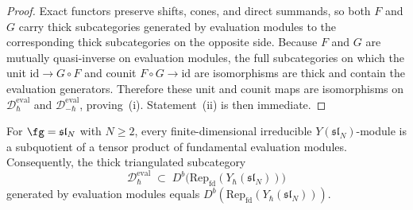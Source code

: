 \begin{proof}
Exact functors preserve shifts, cones, and direct summands, so both
$F$ and $G$ carry thick subcategories generated by evaluation modules
to the corresponding thick subcategories on the opposite side.
Because $F$ and $G$ are mutually quasi-inverse on evaluation modules,
the full subcategories on which the unit
$\mathrm{id}\to G\!\circ F$ and counit $F\!\circ G\to\mathrm{id}$ are
isomorphisms are thick and contain the evaluation generators.
Therefore these unit and counit maps are isomorphisms on
$\mathcal{D}_{\hbar}^{\mathrm{eval}}$ and
$\mathcal{D}_{-\hbar}^{\mathrm{eval}}$, proving~\textup{(i)}.
Statement~\textup{(ii)} is then immediate.
\end{proof}

\begin{proposition}
\label{prop:dk2-thick-generation-typeA}
For $\fg = \mathfrak{sl}_N$ with $N \ge 2$, every finite-dimensional
irreducible $Y(\mathfrak{sl}_N)$-module is a subquotient of a tensor
product of fundamental evaluation modules. Consequently, the
thick triangulated subcategory
\[
\mathcal{D}_{\hbar}^{\mathrm{eval}}
\;\subset\;
D^b\bigl(\mathrm{Rep}_{\mathrm{fd}}(Y_\hbar(\mathfrak{sl}_N))\bigr)
\]
generated by evaluation modules equals
$D^b(\mathrm{Rep}_{\mathrm{fd}}(Y_\hbar(\mathfrak{sl}_N)))$.
\end{proposition}

